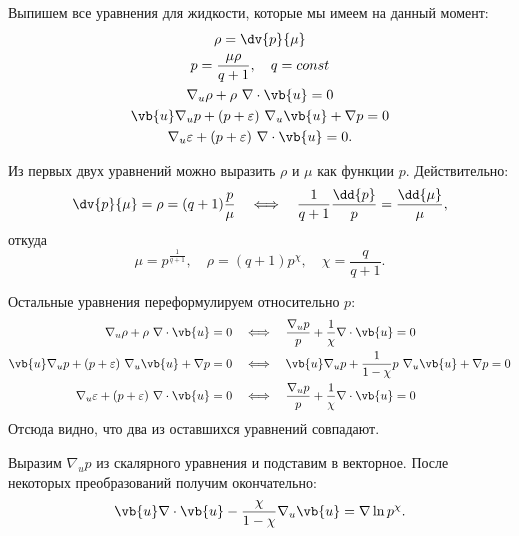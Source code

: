 \documentclass[\docroot/reports/draft/report.tex]{subfiles}
\begin{document}
    Выпишем все уравнения для жидкости, которые мы имеем на данный момент:
    \begin{gather}
        \rho = \dv{p}{\mu} \\
        p = \frac{\mu\rho}{q + 1} , \quad q = const \\
        \nabla_u \rho + \rho\ \nabla \cdot \vb{u} = 0 \\
        \vb{u} \nabla_u p + (p + \varepsilon)\ \nabla_u \vb{u} + \nabla p = 0 \\
        \nabla_u \varepsilon + (p + \varepsilon)\ \nabla \cdot \vb{u} = 0 .
    \end{gather}

    Из первых двух уравнений можно выразить $\rho$ и $\mu$ как функции $p$. Действительно:
    \begin{equation*}
        \dv{p}{\mu} = \rho = (q + 1) \frac{p}{\mu} \quad\Longleftrightarrow\quad
        \frac{1}{q + 1} \frac{\dd{p}}{p} = \frac{\dd{\mu}}{\mu} ,
    \end{equation*}
    откуда
    \begin{equation*}
        \mu = p^{\frac{1}{q + 1}} , \quad \rho = (q + 1) p^{\chi} , \quad \chi = \frac{q}{q + 1} .
    \end{equation*}

    Остальные уравнения переформулируем относительно $p$:
    \begin{align*}
        \nabla_u \rho + \rho\ \nabla \cdot \vb{u} = 0 \quad&\Longleftrightarrow\quad
        \frac{\nabla_u p}{p} + \frac{1}{\chi} \nabla \cdot \vb{u} = 0 \\
        \vb{u} \nabla_u p + (p + \varepsilon)\ \nabla_u \vb{u} + \nabla p = 0 \quad&\Longleftrightarrow\quad
        \vb{u} \nabla_u p + \frac{1}{1-\chi} p\ \nabla_u \vb{u} + \nabla p = 0 \\
        \nabla_u \varepsilon + (p + \varepsilon)\ \nabla \cdot \vb{u} = 0 \quad&\Longleftrightarrow\quad
        \frac{\nabla_u p}{p} + \frac{1}{\chi} \nabla \cdot \vb{u} = 0
    \end{align*}
    Отсюда видно, что два из оставшихся уравнений совпадают.

    Выразим $\nabla_u p$ из скалярного уравнения и подставим в векторное. После некоторых преобразований получим окончательно:
    \begin{equation}
        \vb{u} \nabla \cdot \vb{u} - \frac{\chi}{1 - \chi} \nabla_u \vb{u} = \nabla \ln p^{\chi} .
    \end{equation}
\end{document}
